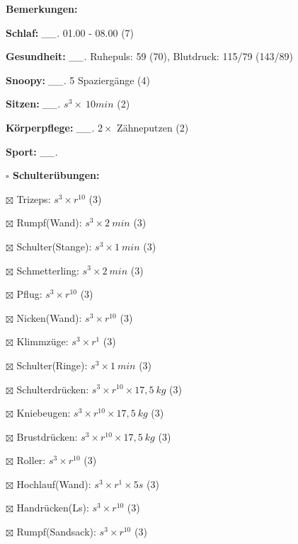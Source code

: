 \documentclass[10pt,a4paper]{article}
\newcommand\prop[1] {{\color {alizarin} {\bf #1}}}             %
\newcommand\mand[1] {{\color {burntorange} {\bf #1}}}          %
\newcommand\topspace{\vskip -15pt \hskip 20pt}
\newcommand\n[1] { {\sl #1.} \hskip 5pt }
\begin{document}
\begin{mdframed}[style=daystyle]
  \begin{labeling}{{\mand {Bemerkungen:}}}
    \setlength\itemsep{-3pt}
  \item[{\mand {Schlaf:}}]        \n{\_\_} 01.00 - 08.00 (7)
  \item[{\mand {Gesundheit:}}]    \n{\_\_} Ruhepuls: 59 (70), Blutdruck: 115/79 (143/89)
  \item[{\mand {Snoopy:}}]        \n{\_\_} 5 Spaziergänge (4)
  \item[{\mand {Sitzen:}}]        \n{\_\_} $s^3 \times\ 10 min$ (2)
  \item[{\mand {Körperpflege:}}]  \n{\_\_} $2 \times$ Zähneputzen (2)
  \item[{\mand {Sport:}}]         \n{\_\_}
    \topspace
    \begin{minipage}{0.75\textwidth}  
      \begin{labeling}{\prop {$\square$ {Schulterübungen:}}} 
        \setlength\itemsep{-3pt}
      \item[$\boxtimes$ Trizeps:]          $s^3 \times r^{10}$ (3)
      \item[$\boxtimes$ Rumpf(Wand):]      $s^3 \times 2\ min$ (3)
      \item[$\boxtimes$ Schulter(Stange):] $s^3 \times 1\ min$ (3)
      \item[$\boxtimes$ Schmetterling:]    $s^3 \times 2\ min$ (3)
      \item[$\boxtimes$ Pflug:]            $s^3 \times r^{10}$ (3)
      \item[$\boxtimes$ Nicken(Wand):]     $s^3 \times r^{10}$ (3)
      \item[$\boxtimes$ Klimmzüge:]        $s^3 \times r^1$ (3)
      \item[$\boxtimes$ Schulter(Ringe):]  $s^3 \times 1\ min$ (3)
      \item[$\boxtimes$ Schulterdrücken:]  $s^3 \times r^{10} \times 17,5\ kg$ (3)
      \item[$\boxtimes$ Kniebeugen:]       $s^3 \times r^{10} \times 17,5\ kg$ (3)
      \item[$\boxtimes$ Brustdrücken:]     $s^3 \times r^{10} \times 17,5\ kg$ (3)
      \item[$\boxtimes$ Roller:]           $s^3 \times r^{10}$ (3)
      \item[$\boxtimes$ Hochlauf(Wand):]   $s^3 \times r^{1} \times 5s$ (3)
      \item[$\boxtimes$ Handrücken(Ls):]   $s^3 \times r^{10}$ (3)
      \item[$\boxtimes$ Rumpf(Sandsack):]  $s^3 \times r^{10}$ (3)

\end{labeling}
\end{minipage}
\end{labeling}
\end{mdframed}
\end{document}
